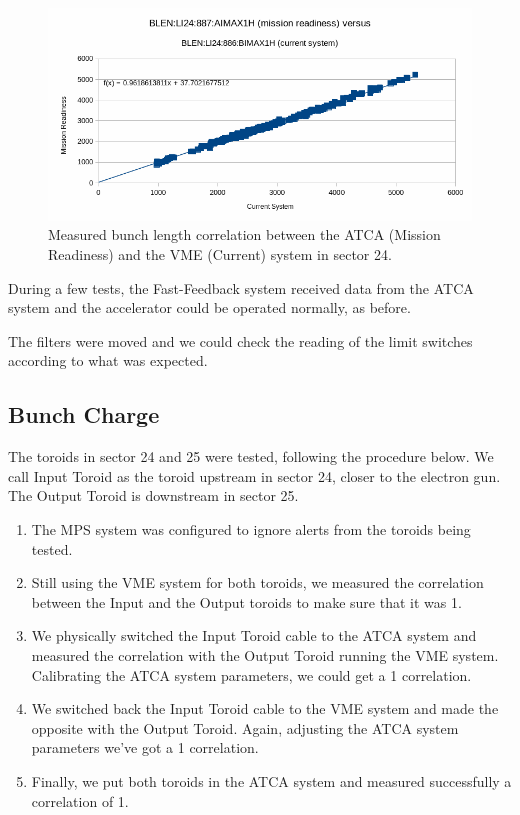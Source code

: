 \documentclass[letter,
        biblatex,   %
        keeplastbox,  %
        ]{jacow}
\begin{document}
\begin{figure}[!htb]
  \centering
  \includegraphics*[width=\columnwidth]{blen_result}
  \caption{Measured bunch length correlation between the ATCA (Mission Readiness) and the VME (Current) system in sector 24.}
  \label{fig:blen_result}
\end{figure}

During a few tests, the Fast-Feedback system received data from the ATCA system and the accelerator could be operated normally, as before.

The filters were moved and we could check the reading of the limit switches according to what was expected.

\subsection{Bunch Charge}
The toroids in sector 24 and 25 were tested, following the procedure below. We call Input Toroid as the toroid upstream in sector 24, closer to the electron gun. The Output Toroid is downstream in sector 25.

\begin{enumerate}
  \item The MPS system was configured to ignore alerts from the toroids being tested.
  \item Still using the VME system for both toroids, we measured the correlation between the Input and the Output toroids to make sure that it was 1.
  \item We physically switched the Input Toroid cable to the ATCA system and measured the correlation with the Output Toroid running the VME system. Calibrating the ATCA system parameters, we could get a 1 correlation.
  \item We switched back the Input Toroid cable to the VME system and made the opposite with the Output Toroid. Again, adjusting the ATCA system parameters we've got a 1 correlation.
  \item Finally, we put both toroids in the ATCA system and measured successfully a correlation of 1.
\end{enumerate}
\end{document}
